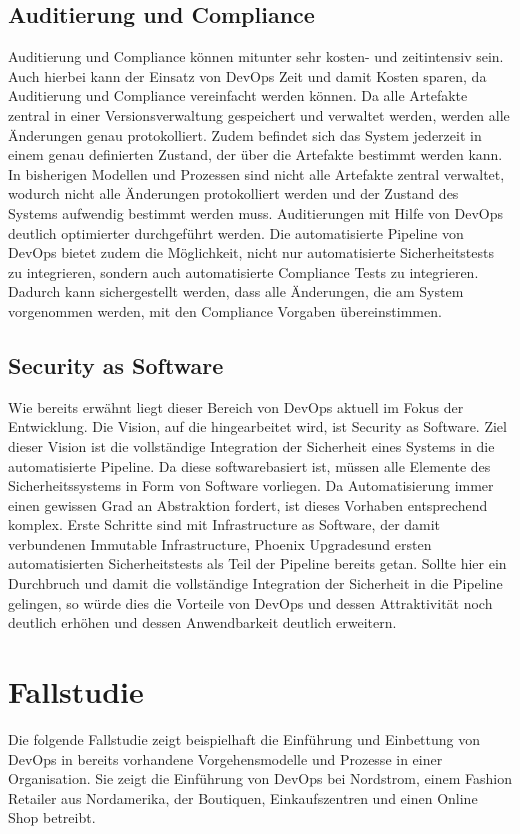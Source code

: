 \subsection{Auditierung und Compliance}
Auditierung und Compliance können mitunter sehr kosten- und zeitintensiv sein. Auch hierbei kann der Einsatz von DevOps Zeit und damit Kosten sparen, da Auditierung und Compliance vereinfacht werden können. Da alle Artefakte zentral in einer Versionsverwaltung gespeichert und verwaltet werden, werden alle Änderungen genau protokolliert. Zudem befindet sich das System jederzeit in einem genau definierten Zustand, der über die Artefakte bestimmt werden kann. In bisherigen Modellen und Prozessen sind nicht alle Artefakte zentral verwaltet, wodurch nicht alle Änderungen protokolliert werden und der Zustand des Systems aufwendig bestimmt werden muss. Auditierungen mit Hilfe von DevOps deutlich optimierter durchgeführt werden. Die automatisierte Pipeline von DevOps bietet zudem die Möglichkeit, nicht nur automatisierte Sicherheitstests zu integrieren, sondern auch automatisierte Compliance Tests zu integrieren. Dadurch kann sichergestellt werden, dass alle Änderungen, die am System vorgenommen werden, mit den Compliance Vorgaben übereinstimmen.\\

\subsection{Security as Software}
Wie bereits erwähnt liegt dieser Bereich von DevOps aktuell im Fokus der Entwicklung. Die Vision, auf die hingearbeitet wird, ist \glqq Security as Software\grqq. Ziel dieser Vision ist die vollständige Integration der Sicherheit eines Systems in die automatisierte Pipeline. Da diese softwarebasiert ist, müssen alle Elemente des Sicherheitssystems in Form von Software vorliegen. Da Automatisierung immer einen gewissen Grad an Abstraktion fordert, ist dieses Vorhaben entsprechend komplex. Erste Schritte sind mit \glqq Infrastructure as Software\grqq, der damit verbundenen \glqq Immutable Infrastructure\grqq, \glqq Phoenix Upgrades\grqq und ersten automatisierten Sicherheitstests als Teil der Pipeline bereits getan. Sollte hier ein Durchbruch und damit die vollständige Integration der Sicherheit in die Pipeline gelingen, so würde dies die Vorteile von DevOps und dessen Attraktivität noch deutlich erhöhen und dessen Anwendbarkeit deutlich erweitern.

\section{Fallstudie} %
Die folgende Fallstudie zeigt beispielhaft die Einführung und Einbettung von DevOps in bereits vorhandene Vorgehensmodelle und Prozesse in einer Organisation. Sie zeigt die Einführung von DevOps bei Nordstrom, einem Fashion Retailer aus Nordamerika, der Boutiquen, Einkaufszentren und einen Online Shop betreibt.

